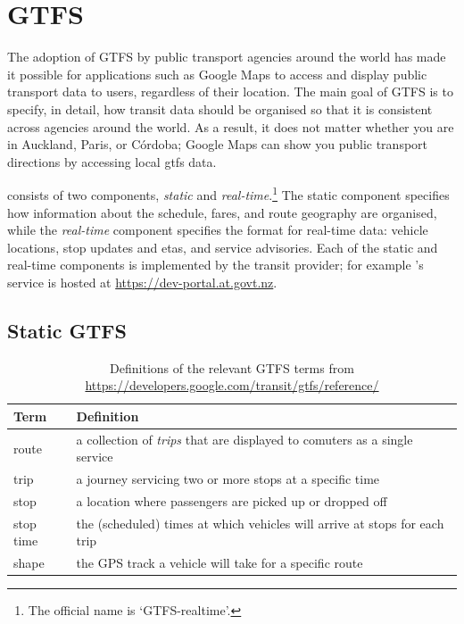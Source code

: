 \section{GTFS}
\label{sec:gtfs}

The adoption of GTFS \citep{GoogleDevelopers_2006} by public transport agencies around the world has made it possible for applications such as Google Maps to access and display public transport data to users, regardless of their location. The main goal of GTFS is to specify, in detail, how transit data should be organised so that it is consistent across agencies around the world. As a result, it does not matter whether you are in Auckland, Paris, or C\'ordoba; Google Maps can show you public transport directions by accessing local \gls{gtfs} data.


\GTFS{} consists of two components, \emph{static} and \emph{real-time}.\footnote{The official name is `GTFS-realtime'.} The static component specifies how information about the schedule, fares, and route geography are organised, while the \emph{real-time} component specifies the format for real-time data: vehicle locations, stop updates and \glspl{eta}, and service advisories. Each of the static and real-time components is implemented by the transit provider; for example \AT{}'s \GTFS{} service is hosted at \url{https://dev-portal.at.govt.nz}.


\subsection{Static GTFS}
\label{sec:gtfs_static}


\begin{table}[t]
\centering
\begin{tabular}{ll}
\toprule
Term & Definition \\
\midrule
route & a collection of \emph{trips} that are displayed to comuters
as a single service \\
trip & a journey servicing two or more stops at a specific time \\
stop & a location where passengers are picked up or dropped off \\
stop time & the (scheduled) times at which vehicles
will arrive at stops for each trip \\
shape & the GPS track a vehicle will take for a specific route \\
\bottomrule
\end{tabular}
\caption[Definitions of GTFS terms]{Definitions of the relevant GTFS terms from \url{https://developers.google.com/transit/gtfs/reference/}}
\label{tab:gtfs_terms}
\end{table}


